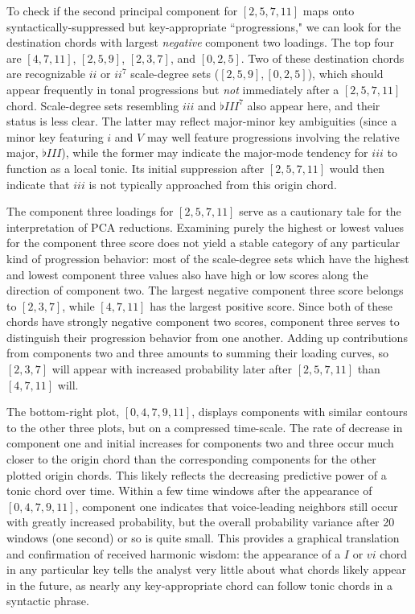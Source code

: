 To check if the second principal component for $[2,5,7,11]$ maps onto syntactically-suppressed but key-appropriate ``progressions," we can look for the destination chords with largest \emph{negative} component two loadings.  The top four are $[4,7,11]$, $[2,5,9]$, $[2,3,7]$, and $[0,2,5]$.  Two of these destination chords are recognizable $ii$ or $ii^7$ scale-degree sets ($[2,5,9],[0,2,5]$), which should appear frequently in tonal progressions but \emph{not} immediately after a $[2,5,7,11]$ chord.  Scale-degree sets resembling $iii$ and $\flat III^7$ also appear here, and their status is less clear.  The latter may reflect major-minor key ambiguities  (since a minor key featuring $i$ and $V$ may well feature progressions involving the relative major, $\flat III$), while the former may indicate the major-mode tendency for $iii$ to function as a local tonic.  Its initial suppression after $[2,5,7,11]$ would then indicate that $iii$ is not typically approached from this origin chord.

The component three loadings for $[2,5,7,11]$ serve as a cautionary tale for the interpretation of PCA reductions.  Examining purely the highest or lowest values for the component three score does not yield a stable category of any particular kind of progression behavior: most of the scale-degree sets which have the highest and lowest component three values also have high or low scores along the direction of component two.  The largest negative component three score belongs to $[2,3,7]$, while $[4,7,11]$ has the largest positive score.  Since both of these chords have strongly negative component two scores, component three serves to distinguish their progression behavior from one another.  Adding up contributions from components two and three amounts to summing their loading curves, so $[2,3,7]$ will appear with increased probability later after $[2,5,7,11]$ than $[4,7,11]$ will.%

The bottom-right plot, $[0,4,7,9,11]$, displays components with similar contours to the other three plots, but on a compressed time-scale.  The rate of decrease in component one and initial increases for components two and three occur much closer to the origin chord than the corresponding components for the other plotted origin chords.  This likely reflects the decreasing predictive power of a tonic chord over time.  Within a few time windows after the appearance of $[0,4,7,9,11]$, component one indicates that voice-leading neighbors still occur with greatly increased probability, but the overall probability variance after 20 windows (one second) or so is quite small.  This provides a graphical translation and confirmation of received harmonic wisdom: the appearance of a $I$ or $vi$ chord in any particular key tells the analyst very little about what chords likely appear in the future, as nearly any key-appropriate chord can follow tonic chords in a syntactic phrase.

